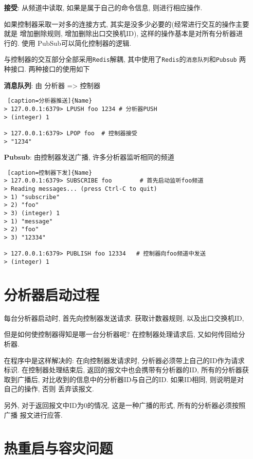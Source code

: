 \textbf{接受}: 从频道中读取, 如果是属于自己的命令信息, 则进行相应操作.

如果控制器采取一对多的连接方式,
其实是没多少必要的(经常进行交互的操作主要就是 增加删除规则,
增加删除出口交换机ID), 这样的操作基本是对所有分析器进行的. 使用
PubSub可以简化控制器的逻辑.

与控制器的交互部分全部采用\texttt{Redis}解耦,
其中使用了\texttt{Redis}的\texttt{消息队列}和\texttt{Pubsub} 两种接口.
两种接口的使用如下

\textbf{消息队列}: 由 分析器 =\textgreater{} 控制器

\begin{lstlisting} [caption=分析器推送]{Name}
> 127.0.0.1:6379> LPUSH foo 1234 # 分析器PUSH
> (integer) 1

> 127.0.0.1:6379> LPOP foo  # 控制器接受
> "1234"
\end{lstlisting}

\textbf{Pubsub}: 由控制器发送广播, 许多分析器监听相同的频道


\begin{lstlisting} [caption=控制器下发]{Name}
> 127.0.0.1:6379> SUBSCRIBE foo        # 首先启动监听foo频道 
> Reading messages... (press Ctrl-C to quit)
> 1) "subscribe"
> 2) "foo"
> 3) (integer) 1
> 1) "message"
> 2) "foo"
> 3) "12334"

> 127.0.0.1:6379> PUBLISH foo 12334   # 控制器向foo频道中发送
> (integer) 1
\end{lstlisting}


\section{分析器启动过程}
\label{sec:分析器启动过程}

  每台分析器启动时, 首先向控制器发送请求. 获取计数器规则, 以及出口交换机ID,

  但是如何使控制器得知是哪一台分析器呢? 在控制器处理请求后, 又如何传回给分析器.

 在程序中是这样解决的: 在向控制器发请求时, 分析器必须带上自己的ID作为请求标识.
在控制器处理结束后, 返回的报文中也会携带有分析器的ID, 所有的分析器获取到广播后,
对比收到的信息中的分析器ID与自己的ID. 如果ID相同, 则说明是对自己的操作, 否则
丢弃该报文.

  另外, 对于返回报文中ID为0的情况, 这是一种广播的形式, 所有的分析器必须按照广播
报文进行应答.

\section{热重启与容灾问题}

